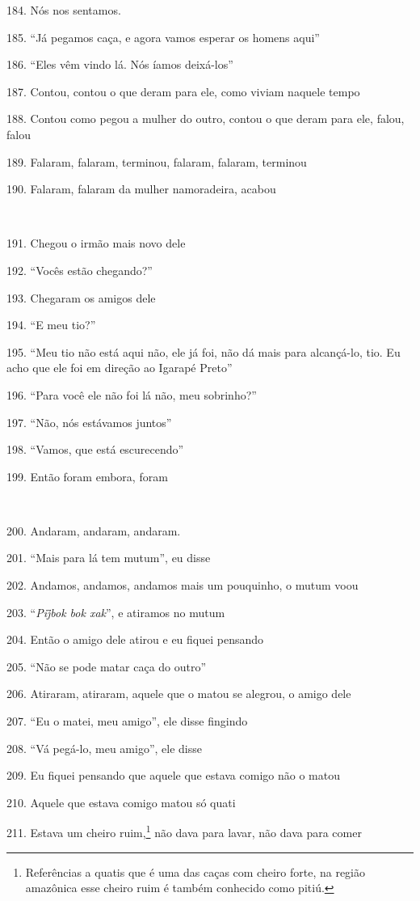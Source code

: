 184. Nós nos sentamos.

185. ``Já pegamos caça, e agora vamos esperar os homens aqui''

186. ``Eles vêm vindo lá. Nós íamos deixá-los''

187. Contou, contou o que deram para ele, como viviam naquele tempo

188. Contou como pegou a mulher do outro, contou o que deram para ele,
falou, falou

189. Falaram, falaram, terminou, falaram, falaram, terminou

190. Falaram, falaram da mulher namoradeira, acabou

~

191. Chegou o irmão mais novo dele

192. ``Vocês estão chegando?''

193. Chegaram os amigos dele

194. ``E meu tio?''

195. ``Meu tio não está aqui não, ele já foi, não dá mais para
alcançá-lo, tio. Eu acho que ele foi em direção ao Igarapé Preto''

196. ``Para você ele não foi lá não, meu sobrinho?''

197. ``Não, nós estávamos juntos''

198. ``Vamos, que está escurecendo''

199. Então foram embora, foram

~

200. Andaram, andaram, andaram.

201. ``Mais para lá tem mutum'', eu disse

202. Andamos, andamos, andamos mais um pouquinho, o mutum voou

203. ``\emph{Pij̃bok bok xak}'', e atiramos no mutum

204. Então o amigo dele atirou e eu fiquei pensando

205. ``Não se pode matar caça do outro''

206. Atiraram, atiraram, aquele que o matou se alegrou, o amigo dele

207. ``Eu o matei, meu amigo'', ele disse fingindo

208. ``Vá pegá-lo, meu amigo'', ele disse

209. Eu fiquei pensando que aquele que estava comigo não o matou

210. Aquele que estava comigo matou só quati

211. Estava um cheiro ruim,\footnote{Referências a quatis que é uma das
  caças com cheiro forte, na região amazônica esse cheiro ruim é também
  conhecido como pitiú.} não dava para lavar, não dava para comer


